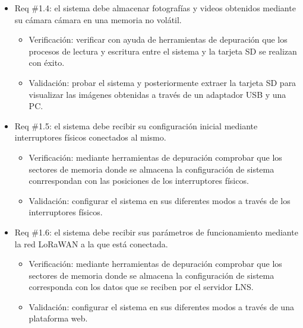 \documentclass[
11pt, %
]{plan}
\begin{document}
\begin{enumerate}
\begin{itemize}
		\end{itemize}
		
		\begin{itemize}
			\item Req \#1.4: el sistema debe almacenar fotografías y videos obtenidos mediante su cámara cámara en una memoria no volátil.

			\begin{itemize}
				\item Verificación: verificar con ayuda de herramientas de depuración que los procesos de lectura y escritura entre el sistema y la tarjeta SD se realizan con éxito.
				\item Validación: probar el sistema y posteriormente extraer la tarjeta SD para visualizar las imágenes obtenidas a través de un adaptador USB y una PC.
			\end{itemize}

		\end{itemize}
		
		\begin{itemize}
			\item Req \#1.5: el sistema debe recibir su configuración inicial mediante interruptores físicos conectados al mismo.

			\begin{itemize}
				\item Verificación: mediante herramientas de depuración comprobar que los sectores de memoria donde se almacena la configuración de sistema conrrespondan con las posiciones de los interruptores físicos.
				\item Validación: configurar el sistema en sus diferentes modos a través de los interruptores físicos.
			\end{itemize}

		\end{itemize}
		
		\begin{itemize}
			\item Req \#1.6: el sistema debe recibir sus parámetros de funcionamiento mediante la red LoRaWAN a la que está conectada.

			\begin{itemize}
				\item Verificación: mediante herramientas de depuración comprobar que los sectores de memoria donde se almacena la configuración de sistema corresponda con los datos que se reciben por el servidor LNS.
				\item Validación: configurar el sistema en sus diferentes modos a través de una plataforma web.
			\end{itemize}


\end{itemize}
\end{enumerate}
\end{document}
